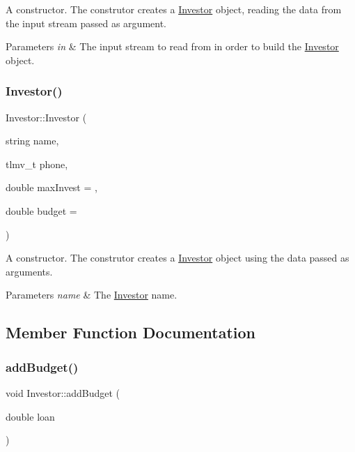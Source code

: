 A constructor. The construtor creates a \hyperlink{class_investor}{Investor} object, reading the data from the input stream passed as argument. 
\begin{DoxyParams}{Parameters}
{\em in} & The input stream to read from in order to build the \hyperlink{class_investor}{Investor} object. \\
\hline
\end{DoxyParams}
\mbox{\label{class_investor_a7d9c11dc51d3804ae26034dff94829f1}} 
\subsubsection{\texorpdfstring{Investor()}{Investor()}\hspace{0.1cm}{\footnotesize\ttfamily [3/3]}}
{\footnotesize\ttfamily Investor\+::\+Investor (\begin{DoxyParamCaption}\item[{string}]{name,  }\item[{tlmv\+\_\+t}]{phone,  }\item[{double}]{max\+Invest = {},  }\item[{double}]{budget = {} }\end{DoxyParamCaption})}

A constructor. The construtor creates a \hyperlink{class_investor}{Investor} object using the data passed as arguments. 
\begin{DoxyParams}{Parameters}
{\em name} & The \hyperlink{class_investor}{Investor} name. \\
\hline
\end{DoxyParams}


\subsection{Member Function Documentation}
\mbox{\label{class_investor_a663245cdc55df66ee98e8f8c7f36bdcb}} 
\subsubsection{\texorpdfstring{add\+Budget()}{addBudget()}}
{\footnotesize\ttfamily void Investor\+::add\+Budget (\begin{DoxyParamCaption}\item[{double}]{loan }\end{DoxyParamCaption})}

